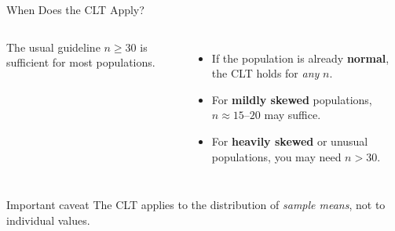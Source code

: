 \documentclass[aspectratio=169]{beamer}
\begin{document}
\begin{frame}{When Does the CLT Apply?}
    \begin{columns}
        \begin{block}{The usual guideline}
            $n \geq 30$ is sufficient for most populations.
        \end{block}
        \medskip
        \begin{itemize}
            \item If the population is already \textbf{normal}, the CLT holds for \emph{any} $n$.
            \item For \textbf{mildly skewed} populations, $n \approx 15$--$20$ may suffice.
            \item For \textbf{heavily skewed} or unusual populations, you may need $n > 30$.
        \end{itemize}
    \end{columns}
    \medskip
    \begin{alertblock}{Important caveat}
        The CLT applies to the distribution of \emph{sample means}, not to individual values.
    \end{alertblock}
\end{frame}
\end{document}
